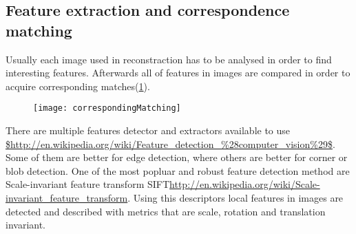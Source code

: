 \subsection{Feature extraction and correspondence matching}
Usually each image used in reconstraction has to be analysed in order to find interesting features. Afterwards all of features in images are compared in order to acquire corresponding matches(\ref{fig:correspondingMatches}).
\begin{figure}[p]
    \centering
    \texttt{[image: correspondingMatching]}
    \caption{}
    \label{fig:correspondingMatches}
\end{figure}
There are multiple features detector and extractors available to use \url{$http://en.wikipedia.org/wiki/Feature_detection_%28computer_vision%29$}. Some of them are better for edge detection, where others are better for corner or blob detection. One of the most popluar and robust feature detection method are Scale-invariant feature transform SIFT\url{http://en.wikipedia.org/wiki/Scale-invariant_feature_transform}. Using this descriptors local features in images are detected and described with metrics that are scale, rotation and translation invariant.
